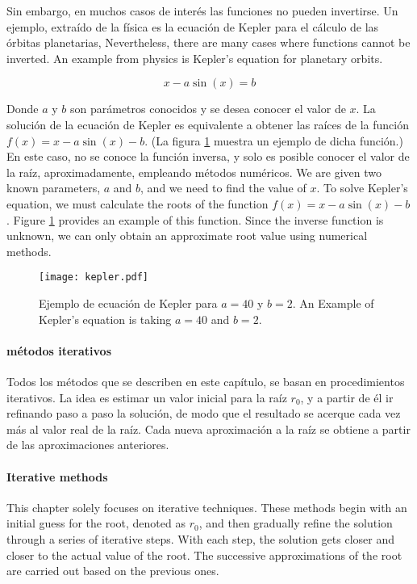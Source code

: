 \begin{paracol}{2}
Sin embargo, en muchos casos de interés las funciones no pueden invertirse.  Un ejemplo, extraído de la física es la ecuación de Kepler para el cálculo de las órbitas planetarias,
\switchcolumn
Nevertheless, there are many cases where functions cannot be inverted. An example from physics is Kepler's equation for planetary orbits.  
\end{paracol}
\begin{equation*}
x-a\sin(x)=b
\end{equation*}
\begin{paracol}{2}
Donde $a$ y $b$ son parámetros conocidos y se desea conocer el valor de $x$. La solución de la ecuación de Kepler es equivalente a obtener las raíces de la función $f(x)=x-a\sin(x)-b$. (La figura \ref{fig:kepler} muestra un ejemplo de dicha función.) En este caso, no se conoce la función inversa, y solo es posible conocer el valor de la raíz, aproximadamente, empleando métodos numéricos.
\switchcolumn
We are given two known parameters, $a$ and $b$, and we need to find the value of $x$. To solve Kepler's equation, we must calculate the roots of the function $f(x) = x - a\sin(x) - b$. Figure \ref{fig:kepler} provides an example of this function. Since the inverse function is unknown, we can only obtain an approximate root value using numerical methods.  
\end{paracol}
\begin{figure}[h]
\centering
	\texttt{[image: kepler.pdf]}
	\caption{Ejemplo de ecuación de Kepler para $a=40$ y $b=2$. An Example of Kepler's equation is taking $a=40$ and $b=2$.}
	\label{fig:kepler}
\end{figure}
\begin{paracol}{2}
\paragraph*{métodos iterativos} 
Todos los métodos que se describen en este capítulo, se basan en procedimientos iterativos. La idea es estimar un valor inicial para la raíz $r_0$, y a partir de él ir refinando paso a paso la solución, de modo que el resultado se acerque cada vez más al valor real de la raíz. Cada nueva aproximación a la raíz se obtiene a partir de las aproximaciones anteriores.
\switchcolumn
\paragraph*{Iterative methods} This chapter solely focuses on iterative techniques. These methods begin with an initial guess for the root, denoted as $r_0$, and then gradually refine the solution through a series of iterative steps. With each step, the solution gets closer and closer to the actual value of the root. The successive approximations of the root are carried out based on the previous ones. 
\end{paracol}
